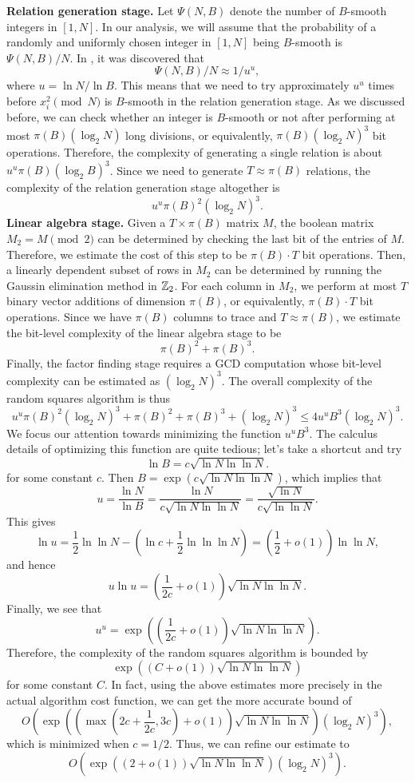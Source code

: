 {\bf Relation generation stage.} Let $\Psi(N, B)$ denote the number of 
$B$-smooth integers in $[1, N]$. In our analysis, we will assume that the 
probability of a randomly and uniformly chosen integer in $[1, N]$ being 
$B$-smooth is $\Psi(N, B)/N$. In \cite{CANFIELD19831}, it was discovered that 
\[ \Psi(N,B)/N \approx 1/u^u, \] 
where $u = \ln N/\ln B$. This means that we need to try approximately $u^u$ 
times before $x_i^2 \pmod N$ is $B$-smooth in the relation generation stage. 
As we discussed before, we can check whether an integer is $B$-smooth or 
not after performing at most $\pi(B) (\log_2 N)$ long divisions, or equivalently, 
$\pi(B) (\log_2 N)^3$ bit operations. Therefore, the complexity of generating 
a single relation is about $u^u \pi(B) (\log_2 B)^3$. Since we need to generate 
$T \approx \pi(B)$ relations, the complexity of the relation generation stage 
altogether is 
\[ u^u \pi(B)^2 (\log_2 N)^3. \] 
{\bf Linear algebra stage.} Given a $T \times \pi(B)$ matrix $M$, the boolean 
matrix $M_2 = M \pmod 2$ can be determined by checking the last bit of the 
entries of $M$. Therefore, we estimate the cost of this step to be $\pi(B) 
\cdot T$ bit operations. Then, a linearly dependent subset of rows in $M_2$ 
can be determined by running the Gaussin elimination method in $\mathbb{Z}_2$. 
For each column in $M_2$, we perform at most $T$ binary vector additions 
of dimension $\pi(B)$, or equivalently, $\pi(B) \cdot T$ bit operations. 
Since we have $\pi(B)$ columns to trace and $T \approx \pi(B)$, we estimate 
the bit-level complexity of the linear algebra stage to be 
\[ \pi(B)^2 + \pi(B)^3. \] 
Finally, the factor finding stage requires a GCD computation whose bit-level 
complexity can be estimated as $(\log_2 N)^3$. The overall complexity of the 
random squares algorithm is thus 
\[ u^u \pi(B)^2 (\log_2 N)^3 + \pi(B)^2 + \pi(B)^3 + (\log_2 N)^3 
\leq 4u^u B^3 (\log_2 N)^3. \] 
We focus our attention towards minimizing the function $u^u B^3$. The calculus 
details of optimizing this function are quite tedious; let's take a shortcut 
and try 
\[ \ln B = c\sqrt{\ln N \ln\ln N}. \] 
for some constant $c$. Then $B = \exp(c\sqrt{\ln N \ln\ln N})$, which implies that 
\[ u = \frac{\ln N}{\ln B} = \frac{\ln N}{c\sqrt{\ln N \ln\ln N}} = 
\frac{\sqrt{\ln N}}{c\sqrt{\ln \ln N}}. \] 
This gives 
\[ \ln u = \frac12 \ln\ln N - \left( \ln c + \frac12 \ln\ln\ln N \right) 
= \left( \frac12 + o(1) \right) \ln\ln N, \] 
and hence 
\[ u\ln u = \left( \frac1{2c} + o(1) \right) \sqrt{\ln N \ln\ln N}. \] 
Finally, we see that 
\[ u^u = \exp\left( \left( \frac1{2c} + o(1) \right) \sqrt{\ln N \ln\ln N} \right). \] 
Therefore, the complexity of the random squares algorithm is bounded by 
\[ \exp\left((C + o(1)) \sqrt{\ln N \ln\ln N}\right) \] 
for some constant $C$. In fact, using the above estimates more precisely in the 
actual algorithm cost function, we can get the more accurate bound of 
\[ O \left( \exp\left(\left( \max \left( 2c + \frac{1}{2c}, 3c \right) + o(1) \right) 
\sqrt{\ln N \ln\ln N} \right) (\log_2 N)^3 \right), \] 
which is minimized when $c = 1/2$. Thus, we can refine our estimate to 
\[ O \left( \exp\left( (2 + o(1)) \sqrt{ \ln N \ln\ln N} \right) (\log_2 N)^3 \right). \] 

